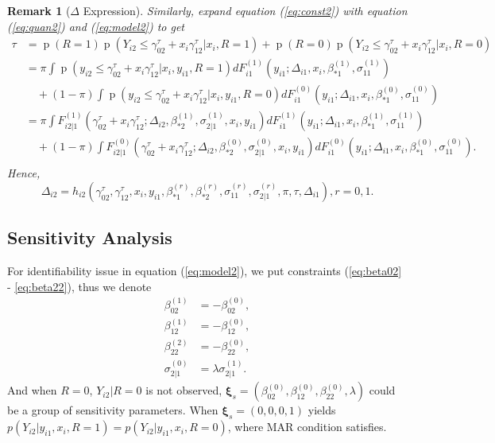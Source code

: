 \documentclass[12pt]{article}
\newtheorem{rmk}[thm]{Remark}
\DeclareMathOperator{\pr}{p}
\begin{document}
\begin{rmk}[$\Delta$ Expression]
  Similarly, expand equation (\ref{eq:const2}) with equation
  (\ref{eq:quan2}) and (\ref{eq:model2}) to get
  \begin{align}
    \tau & = \pr (R = 1) \pr (Y_{i2} \leq \gamma^{\tau}_{02} + x_i
    \gamma^{\tau}_{12} | x_i , R = 1) + \pr (R = 0) \pr (Y_{i2} \leq
    \gamma^{\tau}_{02} + x_i
    \gamma^{\tau}_{12} | x_i , R = 0)  \\
    & = \pi \int \pr (y_{i2} \leq \gamma^{\tau}_{02} + x_i \gamma^{\tau}_{12} | x_i , y_{i1}, R = 1) dF_{i1}^{(1)}(y_{i1}; \Delta_{i1}, x_i, \beta_{*1}^{(1)}, \sigma_{11}^{(1)})  \\
    & \quad + (1-\pi) \int \pr (y_{i2} \leq \gamma^{\tau}_{02} + x_i \gamma^{\tau}_{12} | x_i , y_{i1}, R = 0) dF_{i1}^{(0)}(y_{i1}; \Delta_{i1}, x_i, \beta_{*1}^{(0)}, \sigma_{11}^{(0)})  \\
\label{eq:delta20}
    & = \pi \int F_{i2|1}^{(1)} (\gamma^{\tau}_{02} + x_i \gamma^{\tau}_{12} ; \Delta_{i2}, \beta_{*2}^{(1)}, \sigma_{2|1}^{(1)}, x_i , y_{i1}) dF_{i1}^{(1)}(y_{i1}; \Delta_{i1}, x_i, \beta_{*1}^{(1)}, \sigma_{11}^{(1)})  \\
    & \quad + (1-\pi) \int F_{i2|1}^{(0)} (\gamma^{\tau}_{02} + x_i \gamma^{\tau}_{12} ; \Delta_{i2},\beta_{*2}^{(0)}, \sigma_{2|1}^{(0)},  x_i , y_{i1}) dF_{i1}^{(0)}(y_{i1}; \Delta_{i1}, x_i, \beta_{*1}^{(0)}, \sigma_{11}^{(0)}).  \\
  \end{align}
  Hence,
  \begin{equation}
    \label{eq:delta2}
    \Delta_{i2} = h_{i2}(\gamma^{\tau}_{02} , \gamma^{\tau}_{12}, x_{i},y_{i1},  \beta_{*1}^{(r)}, \beta_{*2}^{(r)},  \sigma_{11}^{(r)}, \sigma_{2|1}^{(r)}, \pi, \tau, \Delta_{i1}), r = 0, 1.
  \end{equation}
\end{rmk}

\subsection{Sensitivity Analysis}
For identifiability issue in equation (\ref{eq:model2}), we put
constraints (\ref{eq:beta02} - \ref{eq:beta22}), thus we denote
\begin{align}
\label{eq:c0}
  \beta_{02}^{(1)} & = - \beta_{02}^{(0)} ,\\
\label{eq:c1}
  \beta_{12}^{(1)} & = -\beta_{12}^{(0)}, \\
\label{eq:c2}
  \beta_{22}^{(2)} & = -\beta_{22}^{(0)}, \\
\label{eq:cs}
  \sigma_{2|1}^{(0)} & = \lambda\sigma_{2|1}^{(1)}.
\end{align}
And when $R = 0$, $Y_{i2}|R = 0$ is not observed, $\bm \xi_s =
(\beta_{02}^{(0)}, \beta_{12}^{(0)}, \beta_{22}^{(0)}, \lambda)$ could
be a group of sensitivity parameters. When $\bm \xi_s = (0, 0, 0, 1)$
yields $p(Y_{i2}|y_{i1}, x_i, R = 1) = p(Y_{i2}| y_{i1}, x_i, R = 0)$,
where MAR condition satisfies.
\end{document}

